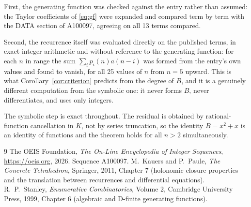 \documentclass[11pt,a4paper]{article}
\theoremstyle{plain}
\theoremstyle{definition}
\begin{document}
First, the generating function was checked against the entry rather than assumed: the
Taylor coefficients of \eqref{eq:gf} were expanded and compared term by term with the DATA
section of A100097, agreeing on all 13 terms compared.

Second, the recurrence itself was evaluated directly on the published terms, in exact
integer arithmetic and without reference to the generating function: for each $n$ in range
the sum $\sum_{i}p_{i}(n)a(n-i)$ was formed from the entry's own values and found to
vanish, for all 25 values of $n$ from $n=5$ upward. This is what
Corollary~\ref{cor:criterion} predicts from the degree of $B$, and it is a genuinely
different computation from the symbolic one: it never forms $B$, never differentiates, and
uses only integers.

The symbolic step is exact throughout. The residual is obtained by rational-function
cancellation in $K$, not by series truncation, so the identity $B=x^{2} + x$ is an
identity of functions and the theorem holds for all $n>2$ simultaneously.

\begin{thebibliography}{9}
 The OEIS Foundation, \emph{The On-Line Encyclopedia of Integer Sequences},
\url{https://oeis.org}, 2026. Sequence A100097.
 M.~Kauers and P.~Paule, \emph{The Concrete Tetrahedron}, Springer, 2011,
Chapter 7 (holonomic closure properties and the translation between recurrences and
differential equations).
 R.~P.~Stanley, \emph{Enumerative Combinatorics}, Volume 2, Cambridge
University Press, 1999, Chapter 6 (algebraic and D-finite generating functions).
\end{thebibliography}
\end{document}
